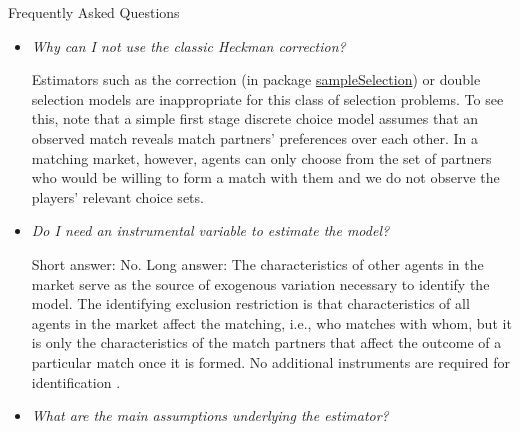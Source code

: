 \noindent Frequently Asked Questions
\begin{itemize}
\item \textit{Why can I not use the classic Heckman correction?}

Estimators such as the \citet{Heckman1979} correction (in package \href{https://CRAN.R-project.org/package=sampleSelection}{sampleSelection}) or double selection models are inappropriate for this class of selection problems. To see this, note that a simple first stage discrete choice model assumes that an observed match reveals match partners' preferences over each other. In a matching market, however, agents can only choose from the set of partners who would be willing to form a match with them and we do not observe the players' relevant choice sets. 

\item \textit{Do I need an instrumental variable to estimate the model?}

Short answer: No. Long answer: The characteristics of other agents in the market serve as the source of exogenous variation necessary to identify the model. The identifying exclusion restriction is that characteristics of all agents in the market affect the matching, i.e., who matches with whom, but it is only the characteristics of the match partners that affect the outcome of a particular match once it is formed. No additional instruments are required for identification \citep{Sorensen2007}. 

\item \textit{What are the main assumptions underlying the estimator?}


\end{itemize}
